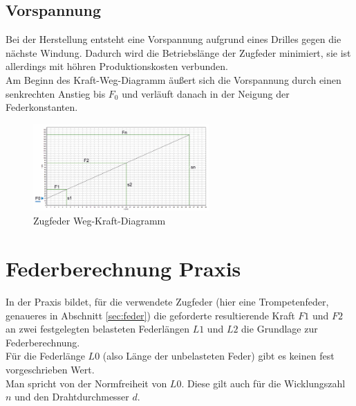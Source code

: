 \subsection{Vorspannung}
Bei der Herstellung entsteht eine Vorspannung aufgrund eines Drilles gegen die nächste
Windung. Dadurch wird die Betriebslänge der Zugfeder minimiert, sie ist allerdings mit höhren Produktionskosten
verbunden.\\
Am Beginn des Kraft-Weg-Diagramm äußert sich die Vorspannung durch einen senkrechten Anstieg
bis $F_0$ und verläuft danach in der Neigung der Federkonstanten.  
\begin{figure}[H]
    \centering
    \includegraphics[width=0.6\textwidth]{bilder/Input/Vorspannung.jpg}
    \caption{Zugfeder Weg-Kraft-Diagramm \cite{KompZ}}
\end{figure}
\newpage
\section{Federberechnung Praxis}

    In der Praxis bildet, für die verwendete Zugfeder (hier eine Trompetenfeder, genaueres in Abschnitt \ref{sec:feder})
    die geforderte resultierende Kraft $F1$ und $F2$ an zwei festgelegten belasteten Federlängen $L1$ und $L2$
    die Grundlage zur Federberechnung.\\

    Für die Federlänge $L0$ (also Länge der unbelasteten Feder) gibt es keinen fest vorgeschrieben Wert.\\
    Man spricht von der Normfreiheit von $L0$. Diese gilt auch für die Wicklungszahl $n$ und den 
    Drahtdurchmesser $d$.

